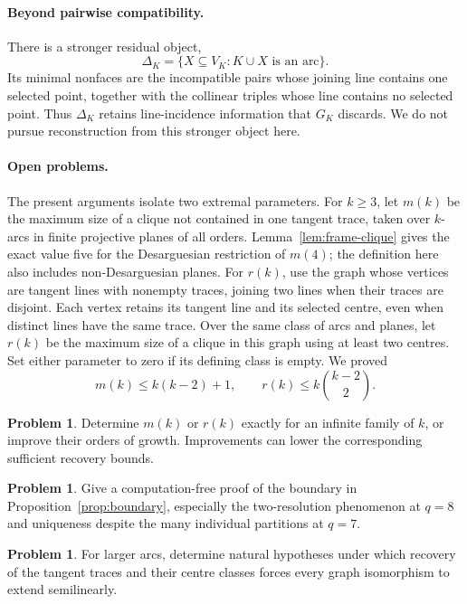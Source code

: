 \documentclass[11pt]{article}
\theoremstyle{definition}
\newtheorem{problem}[theorem]{Problem}
\theoremstyle{remark}
\begin{document}
\paragraph{Beyond pairwise compatibility.}
There is a stronger residual object,
\[
 \Delta_K=\{X\subseteq V_K:K\cup X\text{ is an arc}\}.
\]
Its minimal nonfaces are the incompatible pairs whose joining line contains
one selected point, together with the collinear triples whose line contains
no selected point.  Thus $\Delta_K$ retains line-incidence information that
$G_K$ discards.  We do not pursue reconstruction from this stronger object here.

\paragraph{Open problems.}
The present arguments isolate two extremal parameters. For $k\ge3$, let
$m(k)$ be the maximum size of a clique not contained in one tangent
trace, taken over $k$-arcs in finite projective planes of all orders.
Lemma~\ref{lem:frame-clique} gives the exact value five for the
Desarguesian restriction of $m(4)$; the definition here also includes
non-Desarguesian planes. For $r(k)$, use the graph whose vertices are
tangent lines with nonempty traces, joining two lines when their traces
are disjoint. Each vertex retains its tangent line and its selected centre,
even when distinct lines have the same trace. Over the same class of arcs
and planes, let $r(k)$ be the maximum size of a clique in this graph
using at least two centres. Set either parameter to zero
if its defining class is empty. We proved
\[
 m(k)\leq k(k-2)+1,
 \qquad
 r(k)\leq k\binom{k-2}{2}.
\]

\begin{problem}\label{prob:extremal}
Determine $m(k)$ or $r(k)$ exactly for an infinite family of $k$, or improve
their orders of growth.  Improvements can lower the corresponding
sufficient recovery bounds.
\end{problem}

\begin{problem}\label{prob:boundary-proof}
Give a computation-free proof of the boundary in
Proposition~\ref{prop:boundary}, especially the two-resolution phenomenon
at $q=8$ and uniqueness despite the many individual partitions at $q=7$.
\end{problem}

\begin{problem}\label{prob:larger-arcs}
For larger arcs, determine natural hypotheses under which recovery of the
tangent traces and their centre classes forces every graph isomorphism to
extend semilinearly.
\end{problem}
\end{document}
